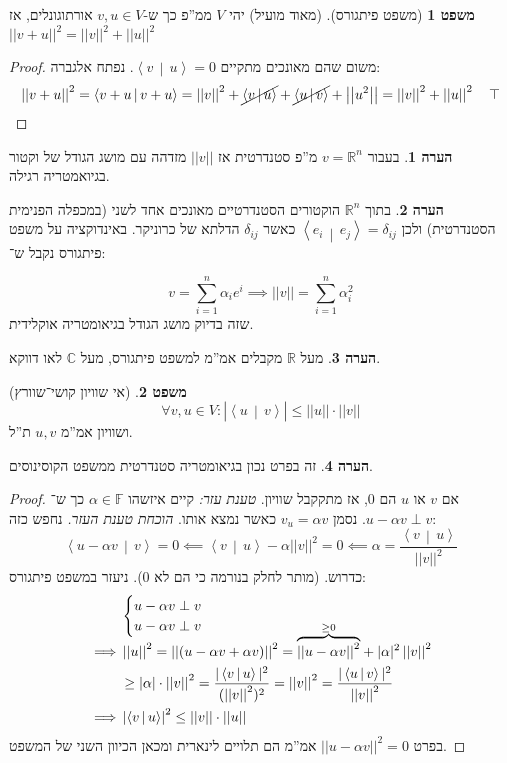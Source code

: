 \documentclass[a4paper]{article}
\newcommand\R     {\mathbb{R}}
\newcommand\C     {\mathbb{C}}
\newcommand\ra    {\rangle}
\newcommand\la    {\langle}
\newcommand\F         {\mathbb{F}}
\newcommand\co        {\colon}
\newcommand\norm[1]   {\left \vert \left \vert #1 \right \vert \right \vert}
\newcommand\mut [2]   {\left \la #1 \,\middle\vert\, #2 \right \ra}
\newcommand\ag        {\alpha}
\newcommand\sof[1]    {\left | #1 \right |}
\newcommand\dequad    {\!\!\!\!\!\!}
\theoremstyle{definition}
\newtheorem{Theorem}{משפט}
\newtheorem{Remark}{הערה}
\newcommand\theo  [1] {\begin{Theorem}#1\end{Theorem}}
\newcommand\rmark [1] {\begin{Remark}#1\end{Remark}}
\begin{document}
	\begin{Theorem}[משפט פיתגורס]
		(מאוד מועיל) יהי $V$ ממ''פ כך ש-$v, u \in V$ אורתוגונלים, אז $\norm{v + u}^2 = \norm{v}^2 + \norm{u}^2$
	\end{Theorem}\begin{proof} משום שהם מאונכים מתקיים $\mut{v}{u} = 0$. נפתח אלגברה: 
		\[ \norm{v + u}^2 = \mut{v + u}{v + u} = \norm{v}^2 + \cancel{\mut{v}{u}} + \cancel{\mut{u}{v}} + \norm{u^2} = \norm{v}^2 + \norm{u}^2 \quad \top \]
	\end{proof}
	
	\rmark{בעבור $v = \R^n$ מ''פ סטנדרטית אז $\norm{v}$ מזדהה עם מושג הגודל של וקטור בגיואמטריה רגילה. }
	
	\rmark{בתוך $\R^n$ הוקטורים הסטנדרטיים מאונכים אחד לשני (במכפלה הפנימית הסטנדרטית) ולכן $\mut{e_i}{e_j} = \delta_{ij}$ כאשר $\delta_{ij}$ הדלתא של כרוניקר. באינדוקציה על משפט פיתגורס נקבל ש־: }
	
	\[ v = \sum_{i = 1}^{n}\ag_i e^i \implies \norm{v} = \sum_{i = 1}^{n}\ag_i^2 \]
	שזה בדיוק מושג הגודל בגיאומטריה אוקלידית. 
	
	\rmark{מעל $\R$ מקבלים אמ''מ למשפט פיתגורס, מעל $\C$ לאו דווקא. }
	
	\theo{(אי שוויון קושי־שוורץ)
		\[ \forall v, u \in V \co \sof{\mut{u}{v}} \le \norm{u}\cdot\norm{v} \]
		ושוויון אמ''מ $u, v$ ת''ל. }
	\rmark{זה בפרט נכון בגיאומטריה סטנדרטית ממשפט הקוסינוסים. }
	
	\begin{proof}
		אם $v$ או $u$ הם $0$, אז מתקקבל שוויון. 
		\textit{טענת עזר: }קיים איזשהו $\ag \in \F$ כך ש־$u - \ag v \perp v$. נסמן $v_u = \ag v$ כאשר נמצא אותו. 
		\textit{הוכחת טענת העזר. }נחפש כזה: 
		\[ \mut{u - \ag v}{v} = 0 \impliedby \mut{v}{u} - \ag \norm{v}^2 = 0 \impliedby \ag = \frac{\mut{v}{u}}{\norm{v}^2} \]
		כדרוש. (מותר לחלק בנורמה כי הם לא $0$). ניעזר במשפט פיתגורס: 
		\begin{align*}
			&\begin{cases}
				u - \ag v \perp v \\ u - \ag v \perp v
			\end{cases}\dequad  \\
			\implies &\norm{u}^2 = \norm{(u - \ag v + \ag v)}^2 = \smash{\overbrace{\norm{u - \ag v}^2}^{\ge 0}} + |\ag|^2\norm{v}^2 \\ 
				&\ge |\ag|\cdot\norm{v}^2 = \frac{|\mut{v}{u}|^2}{(\norm{v}^2)^2} = \norm{v}^2 = \frac{|\mut{u}{v}|^2}{\norm{v}^2} \\
			\implies &\sof{\mut{v}{u}}^2 \le \norm{v} \cdot \norm{u}
		\end{align*}
		בפרט $\norm{u - \ag v}^2 = 0$ אמ''מ הם תלויים לינארית ומכאן הכיוון השני של המשפט. 
	\end{proof}
	
\end{document}
